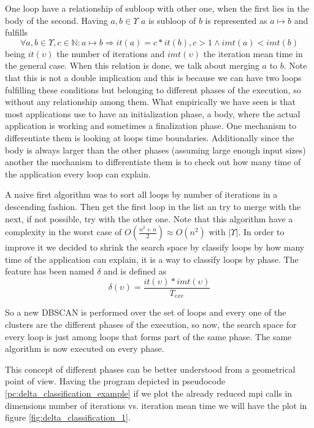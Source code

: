 One loop have a relationship of subloop with other one, when the first lies in
the body of the second. Having $a,b \in \Upsilon$ $a$ is subloop of $b$ is 
represented as $a \mapsto b$ and fulfills 
\begin{equation}
  \label{eq:subloop_rel_imp}
  \forall a,b \in \Upsilon, c \in \mathbb{N} : a \mapsto b \Rightarrow it(a) = c*it(b), c > 1 \land 
imt(a) < imt(b)
\end{equation}
being $it(\upsilon)$ the number of iterations and $imt(\upsilon)$ the iteration
mean time in the general case. When this relation is done, we talk about merging
$a$ to $b$. Note that this is not a double implication and
this is because we can have two loops fulfilling these conditions but belonging
to different phases of the execution, so without any relationship among them. 
What empirically we have seen is that most applications use to have an 
initialization phase, a body, where the actual application is working and 
sometimes a finalization phase. One mechanism to differentiate them is looking
at loops time boundaries. Additionally since the body is always larger than the
other phases (assuming large enough input sizes) another the mechanism to 
differentiate them is to check out how many time of the application every loop
can explain. 

A naive first algorithm was to sort all loops by number of iterations in a
descending fashion. Then get the first loop in the list an try to merge with the
next, if not possible, try with the other one. Note that this algorithm have a
complexity in the worst case of $O(\frac{n^{2}+n}{2}) \approx O(n^{2})$ with
$|\Upsilon|$. In order to improve it we decided to shrink the search space by
classify loops by how many time of the application can explain, it is a way to
classify loops by phase. The feature has been named $\delta$ and is defined as
$$
\delta(\upsilon)=\frac{it(\upsilon)*imt(\upsilon)}{T_{exe}}
$$

So a new DBSCAN is performed over the set of loops and every one of the clusters
are the different phases of the execution, so now, the search space for every
loop is just among loops that forms part of the same phase. The same algorithm
is now executed on every phase.

This concept of different phases can be better understood from a geometrical
point of view. Having the program depicted in pseudocode
\ref{pc:delta_classification_example} if we plot the
already reduced mpi calls in dimensions number of iterations vs. iteration mean
time we will have the plot in figure \ref{fig:delta_classification_1}.

